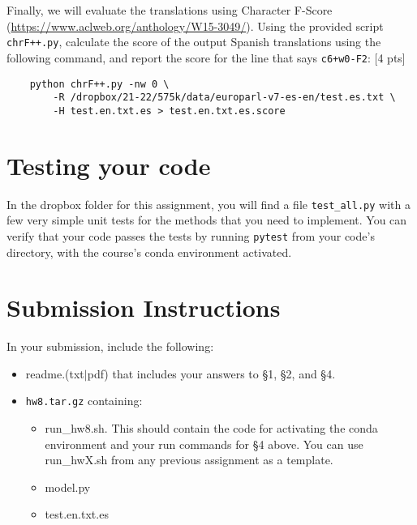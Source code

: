 \documentclass[11pt]{article}
\begin{document}
\vspace{2em}
 Finally, we will evaluate the translations using Character F-Score (\url{https://www.aclweb.org/anthology/W15-3049/}). Using the provided script \texttt{chrF++.py}, calculate the score of the output Spanish translations using the following command, and report the score for the line that says \texttt{c6+w0-F2}: \hfill [4 pts]
\begin{lstlisting}
    python chrF++.py -nw 0 \ 
        -R /dropbox/21-22/575k/data/europarl-v7-es-en/test.es.txt \
        -H test.en.txt.es > test.en.txt.es.score
\end{lstlisting}

\section{Testing your code}

In the dropbox folder for this assignment, you will find a file \texttt{test\_all.py} with a few very simple unit tests for the methods that you need to implement.  You can verify that your code passes the tests by running \texttt{pytest} from your code's directory, with the course's conda environment activated.


\section*{Submission Instructions}

In your submission, include the following:
\begin{itemize}
  \item readme.(txt$\mid$pdf) that includes your answers to \S1, \S2, and \S4. 
  \item \texttt{hw8.tar.gz} containing:
  \begin{itemize}
    \item run\_hw8.sh.  This should contain the code for activating the conda environment and your run commands for \S4 above.  You can use run\_hwX.sh from any previous assignment as a template.
    \item model.py
    \item test.en.txt.es
    \end{itemize}
\end{itemize}
\end{document}
